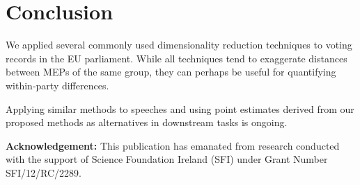 \documentclass{llncs}
\begin{document}
\section{Conclusion}
We applied several commonly used dimensionality reduction techniques to voting records in the EU parliament. While all techniques tend to exaggerate distances between MEPs of the same group, they can perhaps be useful for quantifying within-party differences.

Applying similar methods to speeches and using point estimates derived from our proposed methods as alternatives in downstream tasks is ongoing. 


\vspace{3mm}
\noindent\textbf{Acknowledgement:} This publication has emanated from research conducted with the support of Science Foundation Ireland (SFI) under Grant Number SFI/12/RC/2289.


 
\end{document}
